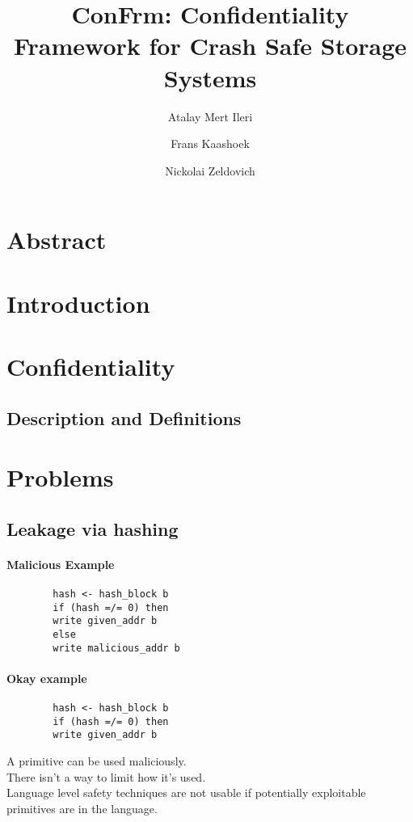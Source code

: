 \documentclass[onecolumn]{paper}
\title{ConFrm: Confidentiality Framework for Crash Safe Storage Systems}
\author{Atalay Mert Ileri \and Frans Kaashoek \and Nickolai Zeldovich}
\begin{document}
\maketitle

\section{Abstract}

\section{Introduction}

\section{Confidentiality}
	\subsection{Description and Definitions}

\section{Problems}
	\subsection{Leakage via hashing}
	\paragraph*{Malicious Example}
	\begin{verbatim}
		hash <- hash_block b
		if (hash =/= 0) then
		write given_addr b
		else
		write malicious_addr b
	\end{verbatim}

	\paragraph*{Okay example}
	\begin{verbatim}
		hash <- hash_block b
		if (hash =/= 0) then
		write given_addr b
	\end{verbatim}

	A primitive can be used maliciously.\\
	There isn’t a way to limit how it’s used.\\
	Language level safety techniques are not usable if potentially exploitable primitives are in the language.
\end{document}

